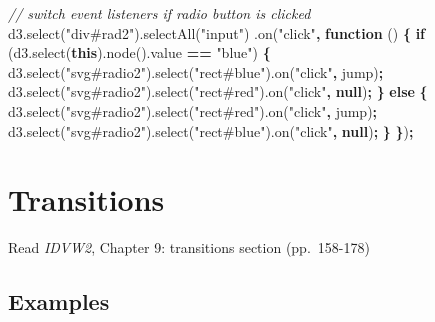 \documentclass[openany]{book}
\newenvironment{Shaded}{\begin{snugshade}}{\end{snugshade}}
\newcommand{\AttributeTok}[1]{\textcolor[rgb]{0.77,0.63,0.00}{#1}}
\newcommand{\CommentTok}[1]{\textcolor[rgb]{0.56,0.35,0.01}{\textit{#1}}}
\newcommand{\ControlFlowTok}[1]{\textcolor[rgb]{0.13,0.29,0.53}{\textbf{#1}}}
\newcommand{\KeywordTok}[1]{\textcolor[rgb]{0.13,0.29,0.53}{\textbf{#1}}}
\newcommand{\NormalTok}[1]{#1}
\newcommand{\OperatorTok}[1]{\textcolor[rgb]{0.81,0.36,0.00}{\textbf{#1}}}
\newcommand{\StringTok}[1]{\textcolor[rgb]{0.31,0.60,0.02}{#1}}
\newcommand{\VariableTok}[1]{\textcolor[rgb]{0.00,0.00,0.00}{#1}}
\begin{document}
\begin{Shaded}
\begin{Highlighting}[]
\CommentTok{// switch event listeners if radio button is clicked}
\VariableTok{d3}\NormalTok{.}\AttributeTok{select}\NormalTok{(}\StringTok{"div#rad2"}\NormalTok{).}\AttributeTok{selectAll}\NormalTok{(}\StringTok{"input"}\NormalTok{)}
\NormalTok{  .}\AttributeTok{on}\NormalTok{(}\StringTok{"click"}\OperatorTok{,} \KeywordTok{function}\NormalTok{ () }\OperatorTok{\{}
  \ControlFlowTok{if}\NormalTok{ (}\VariableTok{d3}\NormalTok{.}\AttributeTok{select}\NormalTok{(}\KeywordTok{this}\NormalTok{).}\AttributeTok{node}\NormalTok{().}\AttributeTok{value} \OperatorTok{==} \StringTok{"blue"}\NormalTok{) }\OperatorTok{\{}
    \VariableTok{d3}\NormalTok{.}\AttributeTok{select}\NormalTok{(}\StringTok{"svg#radio2"}\NormalTok{).}\AttributeTok{select}\NormalTok{(}\StringTok{"rect#blue"}\NormalTok{).}\AttributeTok{on}\NormalTok{(}\StringTok{"click"}\OperatorTok{,}\NormalTok{ jump)}\OperatorTok{;}
    \VariableTok{d3}\NormalTok{.}\AttributeTok{select}\NormalTok{(}\StringTok{"svg#radio2"}\NormalTok{).}\AttributeTok{select}\NormalTok{(}\StringTok{"rect#red"}\NormalTok{).}\AttributeTok{on}\NormalTok{(}\StringTok{"click"}\OperatorTok{,} \KeywordTok{null}\NormalTok{)}\OperatorTok{;}
    \OperatorTok{\}} \ControlFlowTok{else} \OperatorTok{\{}
    \VariableTok{d3}\NormalTok{.}\AttributeTok{select}\NormalTok{(}\StringTok{"svg#radio2"}\NormalTok{).}\AttributeTok{select}\NormalTok{(}\StringTok{"rect#red"}\NormalTok{).}\AttributeTok{on}\NormalTok{(}\StringTok{"click"}\OperatorTok{,}\NormalTok{ jump)}\OperatorTok{;}
    \VariableTok{d3}\NormalTok{.}\AttributeTok{select}\NormalTok{(}\StringTok{"svg#radio2"}\NormalTok{).}\AttributeTok{select}\NormalTok{(}\StringTok{"rect#blue"}\NormalTok{).}\AttributeTok{on}\NormalTok{(}\StringTok{"click"}\OperatorTok{,} \KeywordTok{null}\NormalTok{)}\OperatorTok{;}
    \OperatorTok{\}}
\OperatorTok{\}}\NormalTok{)}\OperatorTok{;}
\end{Highlighting}
\end{Shaded}

\hypertarget{transitions}{%
\chapter{Transitions }\label{transitions}}

Read \emph{IDVW2}, Chapter 9: transitions section (pp.~158-178)

\hypertarget{examples-1}{%
\section{Examples}\label{examples-1}}
\end{document}
